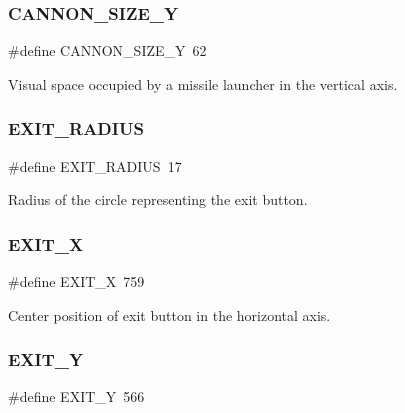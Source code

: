 \subsubsection{\texorpdfstring{C\+A\+N\+N\+O\+N\+\_\+\+S\+I\+Z\+E\+\_\+Y}{CANNON\_SIZE\_Y}}
{\footnotesize\ttfamily \#define C\+A\+N\+N\+O\+N\+\_\+\+S\+I\+Z\+E\+\_\+Y~62}



Visual space occupied by a missile launcher in the vertical axis. 

\hypertarget{group___b_m_ps_holder_ga7c73a85659bf774239d3897ab04e68de}{}\label{group___b_m_ps_holder_ga7c73a85659bf774239d3897ab04e68de} 
\subsubsection{\texorpdfstring{E\+X\+I\+T\+\_\+\+R\+A\+D\+I\+US}{EXIT\_RADIUS}}
{\footnotesize\ttfamily \#define E\+X\+I\+T\+\_\+\+R\+A\+D\+I\+US~17}



Radius of the circle representing the exit button. 

\hypertarget{group___b_m_ps_holder_gaefbb305e5b4d7c7402d158fff6f1c163}{}\label{group___b_m_ps_holder_gaefbb305e5b4d7c7402d158fff6f1c163} 
\subsubsection{\texorpdfstring{E\+X\+I\+T\+\_\+X}{EXIT\_X}}
{\footnotesize\ttfamily \#define E\+X\+I\+T\+\_\+X~759}



Center position of exit button in the horizontal axis. 

\hypertarget{group___b_m_ps_holder_ga46bb001d1c62f7725f3258824caeb260}{}\label{group___b_m_ps_holder_ga46bb001d1c62f7725f3258824caeb260} 
\subsubsection{\texorpdfstring{E\+X\+I\+T\+\_\+Y}{EXIT\_Y}}
{\footnotesize\ttfamily \#define E\+X\+I\+T\+\_\+Y~566}



